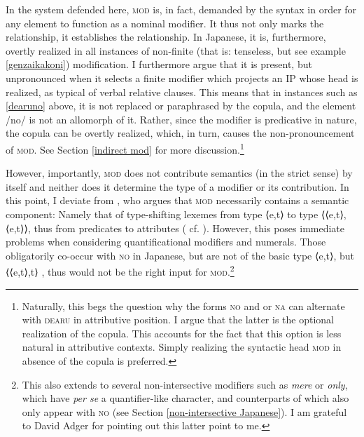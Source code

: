 In the system defended here, \textsc{mod} is, in fact, demanded by the syntax in order for any element to function as a nominal modifier. It thus not only marks the relationship, it establishes the relationship. In Japanese, it is, furthermore, overtly realized in all instances of non-finite (that is: tenseless, but see example \ref{genzaikakoni}) modification. I furthermore argue that it is present, but unpronounced when it selects a finite modifier which projects an IP whose head is realized, as typical of verbal relative clauses. This means that in instances such as \ref{dearuno} above, it is not replaced or paraphrased by the copula, and the element /no/ is not an allomorph of it. Rather, since the modifier is predicative in nature, the copula can be overtly realized, which, in turn, causes the non-pronouncement of \textsc{mod}. See Section \ref{indirect mod} for more discussion.\footnote{Naturally, this begs the question why the forms \textsc{no} and or \textsc{na} can alternate with \textsc{dearu} in attributive position. I argue that the latter is the optional realization of the copula. This accounts for the fact that this option is less natural in attributive contexts. Simply realizing the syntactic head \textsc{mod} in absence of the copula is preferred.} 

However, importantly, \textsc{mod} does not contribute semantics (in the strict sense) by itself and neither does it determine the type of a modifier or its contribution. In this point, I deviate from \citet{rubin:1994:mod}, who argues that \textsc{mod} necessarily contains a semantic component: Namely that of type-shifting lexemes from type ⟨e,t⟩ to type ⟨⟨e,t⟩,⟨e,t⟩⟩, thus from predicates to attributes (\citealt[171–177]{rubin:1994:mod} cf. \citealt{partee:1986:noun}). However, this poses immediate problems when considering quantificational modifiers and numerals. Those obligatorily co-occur with \textsc{no} in Japanese, but are not of the basic type ⟨e,t⟩, but ⟨⟨e,t⟩,t⟩ \citep{partee:1986:noun}, thus would not be the right input for \textsc{mod}.\footnote{This also extends to several non-intersective modifiers such as \textit{mere} or \textit{only}, which have \textit{per se} a quantifier-like character, and counterparts of which also only appear with \textsc{no} (see Section \ref{non-intersective Japanese}). I am grateful to David Adger for pointing out this latter point to me.}

